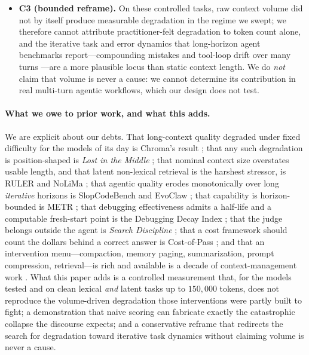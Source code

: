 \documentclass[11pt]{article}
\begin{document}
\begin{itemize}
  \item \textbf{C3 (bounded reframe).} On these controlled tasks, raw context volume did not by itself produce measurable degradation in the regime we swept; we therefore cannot attribute practitioner-felt degradation to token count alone, and the iterative task and error dynamics that long-horizon agent benchmarks report---compounding mistakes and tool-loop drift over many turns \cite{orlanski2026slopcodebench, deng2026evoclaw}---are a more plausible locus than static context length. We do \emph{not} claim that volume is never a cause: we cannot determine its contribution in real multi-turn agentic workflows, which our design does not test.
\end{itemize}

\paragraph{What we owe to prior work, and what this adds.} We are explicit about our debts. That long-context quality degraded under fixed difficulty for the models of its day is Chroma's result \cite{hong2025contextrot}; that any such degradation is position-shaped is \emph{Lost in the Middle} \cite{liu2024lostmiddle}; that nominal context size overstates usable length, and that latent non-lexical retrieval is the harshest stressor, is RULER and NoLiMa \cite{hsieh2024ruler, modarressi2025nolima}; that agentic quality erodes monotonically over long \emph{iterative} horizons is SlopCodeBench and EvoClaw \cite{orlanski2026slopcodebench, deng2026evoclaw}; that capability is horizon-bounded is METR \cite{kwa2025metr}; that debugging effectiveness admits a half-life and a computable fresh-start point is the Debugging Decay Index \cite{adnan2025ddi}; that the judge belongs outside the agent is \emph{Search Discipline} \cite{srinivasan2026searchdiscipline}; that a cost framework should count the dollars behind a correct answer is Cost-of-Pass \cite{erol2025costofpass}; and that an intervention menu---compaction, memory paging, summarization, prompt compression, retrieval---is rich and available is a decade of context-management work \cite{packer2023memgpt, wang2023recursive, jiang2023llmlingua, jiang2024longllmlingua, lewis2020rag, chopra2026headroom, rajasekaran2025contextengineering, yan2025dontbuild}. What this paper adds is a controlled measurement that, for the models tested and on clean lexical \emph{and} latent tasks up to $150{,}000$ tokens, does not reproduce the volume-driven degradation those interventions were partly built to fight; a demonstration that naive scoring can fabricate exactly the catastrophic collapse the discourse expects; and a conservative reframe that redirects the search for degradation toward iterative task dynamics without claiming volume is never a cause.
\end{document}
